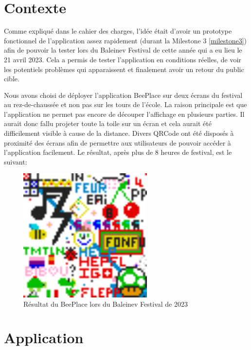 \section{Contexte}

Comme expliqué dans le cahier des charges, l'idée était d'avoir un prototype fonctionnel de l'application assez rapidement (durant la Milestone 3 \ref{milestone3}) afin de pouvoir la tester lors du Baleinev Festival de cette année qui a eu lieu le 21 avril 2023. Cela a permis de tester l'application en conditions réelles, de voir les potentiels problèmes qui apparaissent et finalement avoir un retour du public cible.

Nous avons choisi de déployer l'application BeePlace sur deux écrans du festival au rez-de-chaussée et non pas sur les tours de l'école. La raison principale est que l'application ne permet pas encore de découper l'affichage en plusieurs parties. Il aurait donc fallu projeter toute la toile sur un écran et cela aurait été difficilement visible à cause de la distance. Divers QRCode ont été disposés à proximité des écrans afin de permettre aux utilisateurs de pouvoir accéder à l'application facilement. Le résultat, après plus de 8 heures de festival, est le suivant:

\begin{figure}[H]
  \centering
  \includegraphics[width=0.6\textwidth]{./assets/figures/baleinev2023.png}
  \caption{Résultat du BeePlace lors du Baleinev Festival de 2023}
  \label{fig:baleinev2023}
\end{figure}

\section{Application}

